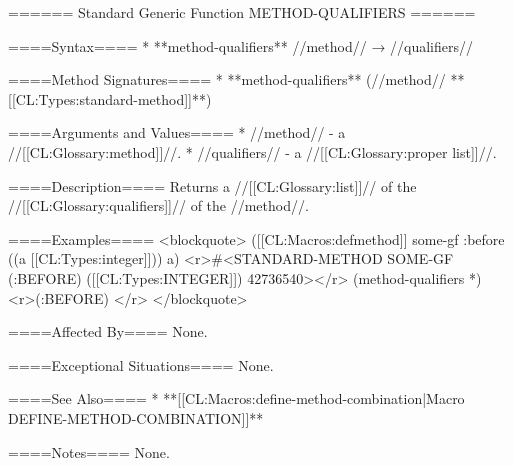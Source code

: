 ====== Standard Generic Function METHOD-QUALIFIERS ======

====Syntax====
  * **method-qualifiers** //method// → //qualifiers//

====Method Signatures====
  * **method-qualifiers** (//method// **[[CL:Types:standard-method]]**)

====Arguments and Values====
  * //method// - a //[[CL:Glossary:method]]//.
  * //qualifiers// - a //[[CL:Glossary:proper list]]//.

====Description====
Returns a //[[CL:Glossary:list]]// of the //[[CL:Glossary:qualifiers]]// of the //method//.

====Examples====
<blockquote>
([[CL:Macros:defmethod]] some-gf :before ((a [[CL:Types:integer]])) a) <r>#<STANDARD-METHOD SOME-GF (:BEFORE) ([[CL:Types:INTEGER]]) 42736540></r>
(method-qualifiers *) <r>(:BEFORE) </r>
</blockquote>

====Affected By====
None.

====Exceptional Situations====
None.

====See Also====
  * **[[CL:Macros:define-method-combination|Macro DEFINE-METHOD-COMBINATION]]**

====Notes====
None.

